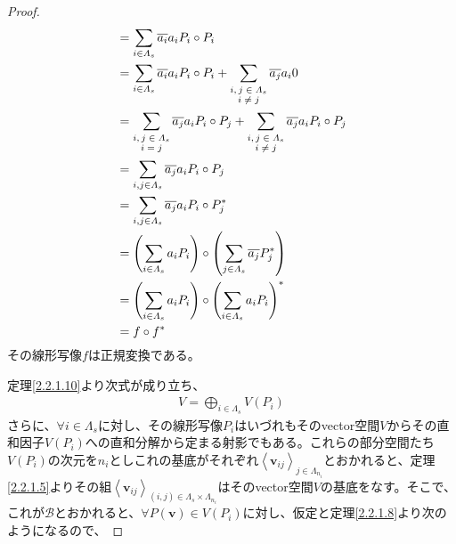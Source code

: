 \documentclass[dvipdfmx]{jsarticle}
\begin{document}
\begin{proof}
\begin{align*}
&= \sum_{i \in \varLambda_{s} } {\overline{a_{i}}a_{i}P_{i} \circ P_{i}}\\
&= \sum_{i \in \varLambda_{s} } {\overline{a_{i}}a_{i}P_{i} \circ P_{i}} + \sum_{\scriptsize \begin{matrix} i,j \in \varLambda_{s} \\i \neq j \\\end{matrix}} {\overline{a_{j}}a_{i}0}\\
&= \sum_{\scriptsize \begin{matrix} i,j \in \varLambda_{s} \\i = j \\\end{matrix}} {\overline{a_{j}}a_{i}P_{i} \circ P_{j}} + \sum_{\scriptsize \begin{matrix} i,j \in \varLambda_{s} \\i \neq j \\\end{matrix}} {\overline{a_{j}}a_{i}P_{i} \circ P_{j}}\\
&= \sum_{i,j \in \varLambda_{s}} {\overline{a_{j}}a_{i}P_{i} \circ P_{j}}\\
&= \sum_{i,j \in \varLambda_{s}} {\overline{a_{j}}a_{i}P_{i} \circ P_{j}^{*}}\\
&= \left( \sum_{i \in \varLambda_{s}} {a_{i}P_{i}} \right) \circ \left( \sum_{j \in \varLambda_{s}} {\overline{a_{j}}P_{j}^{*}} \right)\\
&= \left( \sum_{i \in \varLambda_{s}} {a_{i}P_{i}} \right) \circ \left( \sum_{i \in \varLambda_{s}} {a_{i}P_{i}} \right)^{*}\\
&= f \circ f^{*}
\end{align*}
その線形写像$f$は正規変換である。\par
定理\ref{2.2.1.10}より次式が成り立ち、
\begin{align*}
V = \bigoplus_{i \in \varLambda_{s}} {V\left( P_{i} \right)}
\end{align*}
さらに、$\forall i \in \varLambda_{s}$に対し、その線形写像$P_{i}$はいづれもそのvector空間$V$からその直和因子$V\left( P_{i} \right)$への直和分解から定まる射影でもある。これらの部分空間たち$V\left( P_{i} \right)$の次元を$n_{i}$としこれの基底がそれぞれ$\left\langle \mathbf{v}_{ij} \right\rangle_{j \in \varLambda_{n_{i}}}$とおかれると、定理\ref{2.2.1.5}よりその組$\left\langle \mathbf{v}_{ij} \right\rangle_{(i,j) \in \varLambda_{s} \times \varLambda_{n_{i}}}$はそのvector空間$V$の基底をなす。そこで、これが$\mathcal{B}$とおかれると、$\forall P\left( \mathbf{v} \right) \in V\left( P_{i} \right)$に対し、仮定と定理\ref{2.2.1.8}より次のようになるので、

\end{proof}
\end{document}
